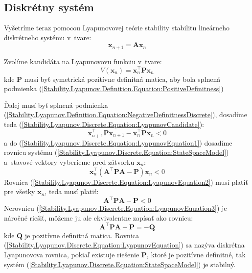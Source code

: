 \documentclass[a4paper, 10pt, ]{article}
\begin{document}
\subsection{Diskrétny systém}

Vyšetríme teraz pomocou Lyapunovovej teórie stability stabilitu lineárneho diskrétneho systému v~tvare:
\begin{equation}
    \label{Stability.Lyapunov.Discrete.Equation:StateSpaceModel}
    \bm{x}_{n + 1} = \bm{A} \bm{x}_{n}
\end{equation}

Zvolíme kandidáta na Lyapunovovu funkciu v~tvare:
\begin{equation}
    \label{Stability.Lyapunov.Discrete.Equation:LyapunovCandidate}
    V(\bm{x}_{n}) = \bm{x}_{n}^\top \bm{P} \bm{x}_{n}
\end{equation}
kde $\bm{P}$ musí byť symetrická pozitívne definitná matica, aby bola splnená podmienka (\ref{Stability.Lyapunov.Definition.Equation:PositiveDefinitness})

Ďalej musí byť splnená podmienka (\ref{Stability.Lyapunov.Definition.Equation:NegativeDefinitnessDiscrete}), dosadíme teda (\ref{Stability.Lyapunov.Discrete.Equation:LyapunovCandidate}):
\begin{equation}
    \label{Stability.Lyapunov.Discrete.Equation:LyapunovEquation1}
    \bm{x}_{n + 1}^\top \bm{P} \bm{x}_{n + 1} - \bm{x}_{n}^\top \bm{P} \bm{x}_{n} < 0
\end{equation}
a do (\ref{Stability.Lyapunov.Discrete.Equation:LyapunovEquation1}) dosadíme rovnicu systému (\ref{Stability.Lyapunov.Discrete.Equation:StateSpaceModel}) a~stavové vektory vyberieme pred zátvorku $\bm{x}_{n}$:
\begin{equation}
    \label{Stability.Lyapunov.Discrete.Equation:LyapunovEquation2}
    \bm{x}_{n}^\top \left( \bm{A}^\top \bm{P} \bm{A} - \bm{P} \right) \bm{x}_{n} < 0
\end{equation}
Rovnica (\ref{Stability.Lyapunov.Discrete.Equation:LyapunovEquation2}) musí platiť pre všetky $\bm{x}_{n}$, teda musí platiť:
\begin{equation}
    \label{Stability.Lyapunov.Discrete.Equation:LyapunovEquation3}
    \bm{A}^\top \bm{P} \bm{A} - \bm{P} < 0
\end{equation}
Nerovnicu (\ref{Stability.Lyapunov.Discrete.Equation:LyapunovEquation3}) je náročné riešiť, môžeme ju ale ekvivalentne zapísať ako rovnicu: 
\begin{equation}
    \label{Stability.Lyapunov.Discrete.Equation:LyapunovEquation}
    \bm{A}^\top \bm{P} \bm{A} - \bm{P} = -\bm{Q}
\end{equation}
kde $\bm{Q}$ je pozitívne definitná matica. Rovnica (\ref{Stability.Lyapunov.Discrete.Equation:LyapunovEquation}) sa nazýva diskrétna Lyapunovova rovnica, pokiaľ existuje riešenie $\bm{P}$, ktoré je pozitívne definitné, tak systém (\ref{Stability.Lyapunov.Discrete.Equation:StateSpaceModel}) je stabilný.
\end{document}

